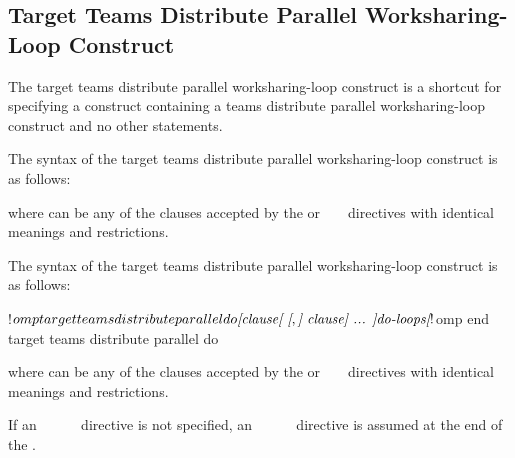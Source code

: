 \subsection{Target Teams Distribute Parallel Worksharing-Loop Construct}
\label{subsec:Target Teams Distribute Parallel Worksharing-Loop Construct}
\summary
The target teams distribute parallel worksharing-loop construct is a shortcut for specifying a 
construct containing a teams distribute parallel worksharing-loop construct and no other statements.

\syntax
\begin{ccppspecific}
The syntax of the target teams distribute parallel worksharing-loop construct is as follows:

\begin{ompcPragma}[fontsize=\small]
#pragma omp target teams distribute parallel for \plc{\}
            \plc{[clause[ [},\plc{] clause] ... ] new-line}
    \plc{for-loops}
\end{ompcPragma}

where  can be any of the clauses accepted by the  or
~ ~ directives with identical
meanings and restrictions.
\end{ccppspecific}

\begin{fortranspecific}
The syntax of the target teams distribute parallel worksharing-loop construct is as follows:

\begin{ompfPragma}
!$omp target teams distribute parallel do \plc{[clause[ [},\plc{] clause] ... ]}
    \plc{do-loops}
\plc{[}!$omp end target teams distribute parallel do\plc{]}
\end{ompfPragma}

where  can be any of the clauses accepted by the  or
~ ~ directives with
identical meanings and restrictions.

If an ~~~~~ directive is not specified, an
~~~~~
directive is assumed at the end of the .
\end{fortranspecific}


